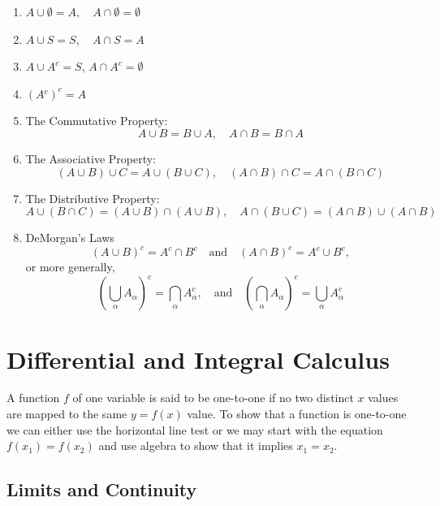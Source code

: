 \documentclass[captions=tableheading]{scrbook}
\begin{document}
\begin{example}
\begin{enumerate}
\item \(A\cup\emptyset=A,\quad A\cap\emptyset=\emptyset\)
\item \(A\cup S=S,\quad A\cap S=A\)
\item \(A\cup A^{c}=S\), \(A\cap A^{c}=\emptyset\)
\item \((A{}^{c})^{c}=A\)
\item The Commutative Property: 
   \begin{equation}
   A \cup B = B\cup A,\quad A\cap B = B\cap A
   \end{equation}
\item The Associative Property: 
   \begin{equation}
   (A\cup B)\cup C=A\cup(B\cup C),\quad(A\cap B)\cap C=A\cap(B\cap C)
   \end{equation}
\item The Distributive Property: 
   \begin{equation}
   A\cup(B\cap C)=(A\cup B)\cap(A\cup B),\quad A\cap(B\cup C)=(A\cap B)\cup(A\cap B)
   \end{equation}
\item DeMorgan's Laws
   \begin{equation}
   (A\cup B)^{c}=A^{c}\cap B^{c}\quad\mbox{and}\quad(A\cap B)^{c}=A^{c}\cup B^{c},
   \end{equation}
   or more generally,
   \begin{equation}
   \left(\bigcup_{\alpha}A_{\alpha}\right)^{c}=\bigcap_{\alpha}A_{\alpha}^{c},\quad\mbox{and}\quad\left(\bigcap_{\alpha}A_{\alpha}\right)^{c}=\bigcup_{\alpha}A_{\alpha}^{c}
   \end{equation}
\end{enumerate}
\section{Differential and Integral Calculus}
\label{sec-21-2}
\label{sec-Differential-and-Integral}


A function \(f\) of one variable is said to be one-to-one if no two distinct \(x\) values are mapped to the same \(y=f(x)\) value. To show that a function is one-to-one we can either use the horizontal line test or we may start with the equation \(f(x_{1}) = f(x_{2})\) and use algebra to show that it implies \(x_{1} = x_{2}\).
\subsection{Limits and Continuity}
\label{sec-21-2-1}


\end{example}
\end{document}
